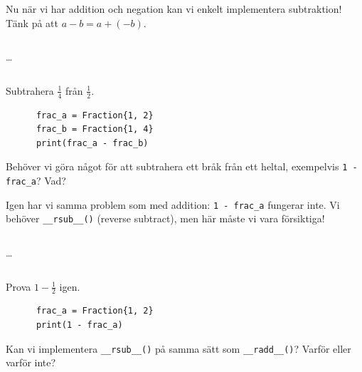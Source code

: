 Nu när vi har addition och negation kan vi enkelt implementera subtraktion!
Tänk på att \(a - b = a + (-b)\).

\begin{frame}[fragile]
  \inputminted[linenos,firstline=3,lastline=3]{python}{examples/myfrac_sub.py}
  \dots
  \inputminted[autogobble=false,linenos,firstline=47,lastline=48]{python}{examples/myfrac_sub.py}

  \begin{example}
    Subtrahera \(\frac{1}{4}\) från \(\frac{1}{2}\).
    \begin{verbatim}
      frac_a = Fraction{1, 2}
      frac_b = Fraction{1, 4}
      print(frac_a - frac_b)
    \end{verbatim}
  \end{example}
\end{frame}

\begin{frame}
  \begin{exercise}
    Behöver vi göra något för att subtrahera ett bråk från ett heltal, 
    exempelvis \texttt{1 - frac_a}?
    Vad?
  \end{exercise}
\end{frame}

Igen har vi samma problem som med addition: \texttt{1 - frac_a} 
fungerar inte.
Vi behöver \texttt{__rsub__()} (\foreignlanguage{english}{reverse 
subtract}), men här måste vi vara försiktiga!

\begin{frame}[fragile]
  \inputminted[linenos,firstline=3,lastline=3]{python}{examples/myfrac_sub.py}
  \dots
  \inputminted[autogobble=false,linenos,firstline=50,lastline=51]{python}{examples/myfrac_sub.py}

  \begin{example}
    Prova \(1 - \frac{1}{2}\) igen.
    \begin{verbatim}
      frac_a = Fraction{1, 2}
      print(1 - frac_a)
    \end{verbatim}
  \end{example}
\end{frame}

\begin{exercise}
  Kan vi implementera \texttt{__rsub__()} på samma sätt som
  \texttt{__radd__()}? Varför eller varför inte?
\end{exercise}

